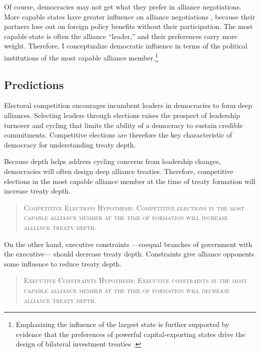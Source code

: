 \documentclass[12pt]{article}
\begin{document}
Of course, democracies may not get what they prefer in alliance negotiations. 
More capable states have greater influence on alliance negotiations \citep{Mattes2012}, because their partners lose out on foreign policy benefits without their participation.
The most capable state is often the alliance ``leader,'' and their preferences carry more weight. 
Therefore, I conceptualize democratic influence in terms of the political institutions of the most capable alliance member.\footnote{Emphasizing the influence of the largest state is further supported by evidence that the preferences of powerful capital-exporting states drive the design of bilateral investment treaties \citep{AlleePeinhardt2014}.} 



\subsection{Predictions}

Electoral competition encourages incumbent leaders in democracies to form deep alliances.
Selecting leaders through elections raises the prospect of leadership turnover and cycling that limits the ability of a democracy to sustain credible commitments. 
Competitive elections are therefore the key characteristic of democracy for understanding treaty depth. 

Because depth helps address cycling concerns from leadership changes, democracies will often design deep alliance treaties. 
Therefore, competitive elections in the most capable alliance member at the time of treaty formation will increase treaty depth. 


\begin{quote}
\textsc{Competitive Elections Hypothesis: Competitive elections in the most capable alliance member at the time of formation will increase alliance treaty depth.}
\end{quote}   

On the other hand, executive constraints ---coequal branches of government with the executive--- should decrease treaty depth. 
Constraints give alliance opponents some influence to reduce treaty depth. 


\begin{quote}
\textsc{Executive Constraints Hypothesis: Executive constraints in the most capable alliance member at the time of formation will decrease alliance treaty depth.}
\end{quote}   
\end{document}
